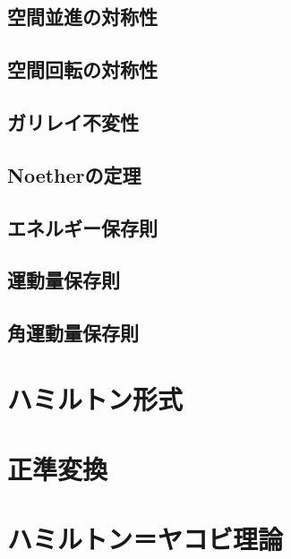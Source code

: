 \documentclass[a4paper]{jsreport}
\begin{document}
        \section{空間並進の対称性}
        \section{空間回転の対称性}
        \section{ガリレイ不変性}
        \section{Noetherの定理}
        \section{エネルギー保存則}
        \section{運動量保存則}
        \section{角運動量保存則}

    \chapter{ハミルトン形式}

    \chapter{正準変換}

    \chapter{ハミルトン＝ヤコビ理論}
\end{document}
